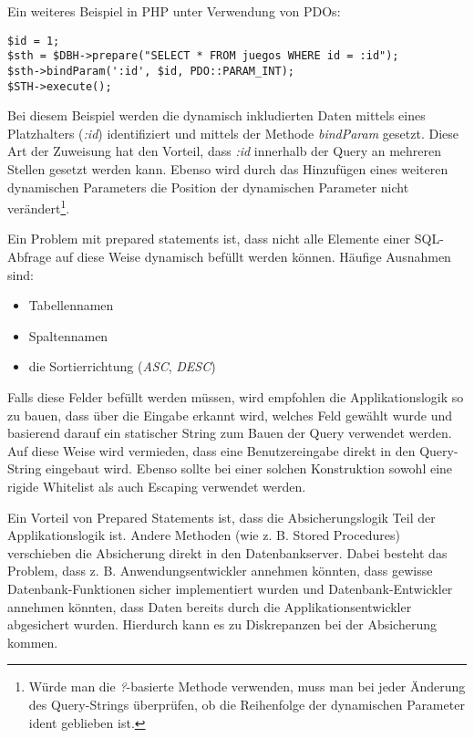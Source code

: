 Ein weiteres Beispiel in PHP unter Verwendung von PDOs:

\begin{verbatim}
$id = 1;
$sth = $DBH->prepare("SELECT * FROM juegos WHERE id = :id");
$sth->bindParam(':id', $id, PDO::PARAM_INT);
$STH->execute();
\end{verbatim}

Bei diesem Beispiel werden die dynamisch inkludierten Daten mittels eines Platzhalters (\textit{:id}) identifiziert und mittels der Methode \textit{bindParam} gesetzt. Diese Art der Zuweisung hat den Vorteil, dass \textit{:id} innerhalb der Query an mehreren Stellen gesetzt werden kann. Ebenso wird durch das Hinzufügen eines weiteren dynamischen Parameters die Position der dynamischen Parameter nicht verändert\footnote{Würde man die \textit{?}-basierte Methode verwenden, muss man bei jeder Änderung des Query-Strings überprüfen, ob die Reihenfolge der dynamischen Parameter ident geblieben ist.}.

Ein Problem mit prepared statements ist, dass nicht alle Elemente einer SQL-Abfrage auf diese Weise dynamisch befüllt werden können. Häufige Ausnahmen sind:

\begin{itemize}
	\item Tabellennamen
	\item Spaltennamen
	\item die Sortierrichtung (\textit{ASC}, \textit{DESC})
\end{itemize}

Falls diese Felder befüllt werden müssen, wird empfohlen die Applikationslogik so zu bauen, dass über die Eingabe erkannt wird, welches Feld gewählt wurde und basierend darauf ein statischer String zum Bauen der Query verwendet werden. Auf diese Weise wird vermieden, dass eine Benutzereingabe direkt in den Query-String eingebaut wird. Ebenso sollte bei einer solchen Konstruktion sowohl eine rigide Whitelist als auch Escaping verwendet werden.

Ein Vorteil von Prepared Statements ist, dass die Absicherungslogik Teil der Applikationslogik ist. Andere Methoden (wie z. B. Stored Procedures) verschieben die Absicherung direkt in den Datenbankserver. Dabei besteht das Problem, dass z. B. Anwendungsentwickler annehmen könnten, dass gewisse Datenbank-Funktionen sicher implementiert wurden und Datenbank-Entwickler annehmen könnten, dass Daten bereits durch die Applikationsentwickler abgesichert wurden. Hierdurch kann es zu Diskrepanzen bei der Absicherung kommen.

